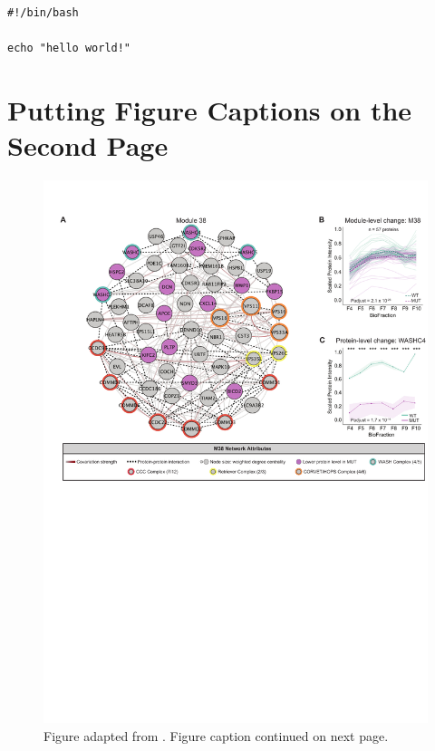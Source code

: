 \documentclass[PhD]{dukethesis}
\begin{document}
\lipsum[1]

\begin{singlespace}
\begin{verbatim}

#!/bin/bash

echo "hello world!"

\end{verbatim}
\end{singlespace}



\chapter{Putting Figure Captions on the Second Page}
\label{chap:04}

\begin{figure}[ht] 
	\begin{center}
		\includegraphics[width=0.7\paperwidth,keepaspectratio]{m38}
			\caption[This is a figure caption.]{Figure adapted from
			\cite{Courtland2021}. Figure caption continued on next page.}
		\label{fig:m38}
	\end{center}
\end{figure}
\end{document}
